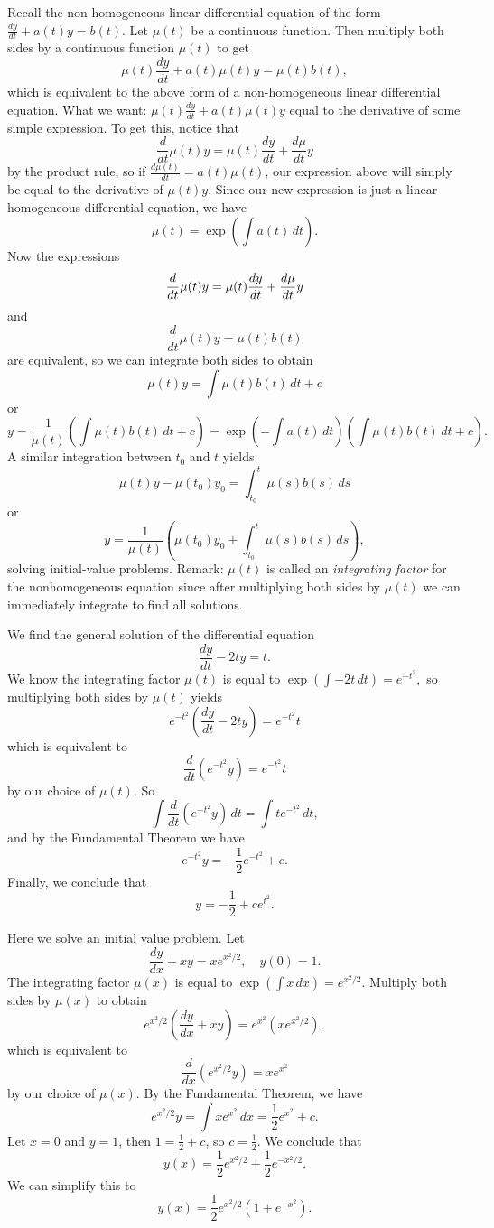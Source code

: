 Recall the non-homogeneous linear differential equation of the form $\frac{dy}{dt}+a(t)y=b(t)$. Let $\mu(t)$ be a continuous function. Then multiply both sides by a continuous function $\mu(t)$ to get \[
    \mu(t)\frac{dy}{dt}+a(t)\mu(t)y=\mu(t)b(t),
\]
which is equivalent to the above form of a non-homogeneous linear differential equation. What we want: $\mu(t)\frac{dy}{dt}+a(t)\mu(t)y$ equal to the derivative of some simple expression. To get this, notice that \[
    \frac{d}{dt} \mu(t)y=\mu(t)\frac{dy}{dt}+\frac{d\mu}{dt}y
\]
by the product rule, so if $\frac{d\mu(t)}{dt}=a(t)\mu(t)$, our expression above will simply be equal to the derivative of $\mu(t)y$. Since our new expression is just a linear homogeneous differential equation, we have \[
    \mu(t)=\exp\left( \int a(t) \, dt \right) .
\]
Now the expressions \[
    \frac{d}{dt} \mu(t)y=\mu(t)\frac{dy}{dt}+\frac{d\mu}{dt}y \\
\] and \[
\frac{d}{dt} \mu(t)y=\mu(t)b(t)
\]
are equivalent, so we can integrate both sides to obtain \[
    \mu(t)y=\int \mu(t)b(t) \, dt+c
\]
or \[
    y=\frac{1}{\mu(t)}\left( \int \mu(t)b(t) \, dt +c\right)=\exp\left( -\int a(t) \, dt \right) \left( \int \mu(t)b(t) \, dt+c \right) .
\]
A similar integration between $t_0$ and $t$ yields \[
    \mu(t)y-\mu(t_0)y_0=\int_{t_0}^{t} \mu(s)b(s) \, ds
\] or \[
y=\frac{1}{\mu(t)}\left( \mu(t_0)y_0+\int_{t_0}^{t} \mu(s)b(s) \, ds \right),
\]
solving initial-value problems. Remark: $\mu(t)$ is called an \emph{integrating factor} for the nonhomogeneous equation since after multiplying both sides by $\mu(t)$ we can immediately integrate to find all solutions.
\begin{example}
    We find the general solution of the differential equation \[
    \frac{dy}{dt}-2ty=t.
    \]
    We know the integrating factor $\mu(t)$ is equal to $\exp\left( \int -2t \, dt \right) = e^{-t^2},$ so multiplying both sides by $\mu(t)$ yields \[
        e^{-t^2}\left( \frac{dy}{dt}-2ty \right) =e^{-t^2}t
    \] which is equivalent to \[
    \frac{d}{dt} \left( e^{-t^2}y \right) = e^{-t^2}t
    \]
    by our choice of $\mu(t)$. So \[
        \int \frac{d}{dt} \left( e^{-t^2}y \right)  \, dt = \int t e^{-t^2} \, dt, 
    \]
    and by the Fundamental Theorem we have \[
    e^{-t^2}y=-\frac{1}{2} e^{-t^2} + c.
    \]
     Finally, we conclude that \[
     y=-\frac{1}{2}+ce^{t^2}.
     \]
\end{example}
\begin{example}
    Here we solve an initial value problem. Let \[
        \frac{dy}{dx}+xy=xe^{x^2/2}, \quad y(0)=1.
    \] The integrating factor $\mu(x)$ is equal to $\exp\left( \int x\, dx \right) = e^{x^2/2}$. Multiply both sides by $\mu(x)$ to obtain \[
    e^{x^2/2}\left( \frac{dy}{dx}+xy \right) =e^{x^2}\left( xe^{x^2/2} \right),
    \] which is equivalent to
    \[
        \frac{d}{dx}\left( e^{x^2/2} y \right) = xe^{x^2}
    \]
    by our choice of $\mu(x)$. By the Fundamental Theorem, we have \[
    e^{x^2/2}y=\int xe^{x^2} \, dx=\frac{1}{2}e^{x^2}+c.
    \]
    Let $x=0$ and $y=1$, then  $1=\frac{1}{2}+c$, so $c=\frac{1}{2}$. We conclude that \[
        y(x)=\frac{1}{2}e^{x^2/2}+\frac{1}{2}e^{-x^2/2}.
\] We can simplify this to \[
y(x) = \frac{1}{2}e^{x^2/2}\left( 1+e^{-x^2} \right) .
\]
\end{example}




